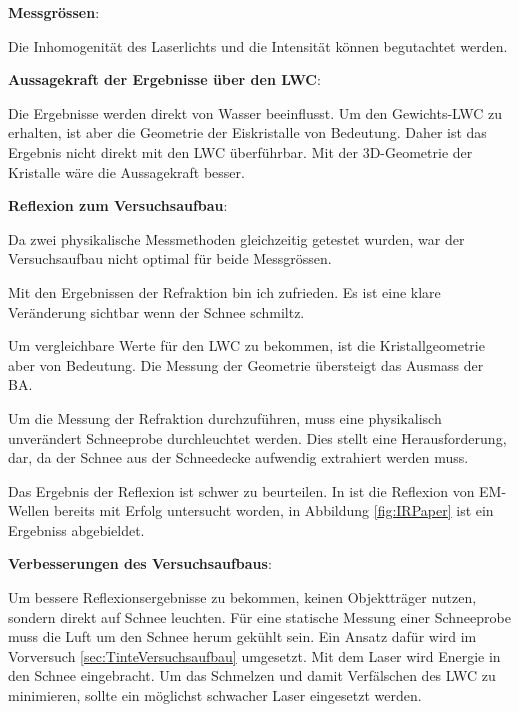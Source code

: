 \textbf{Messgrössen}:

Die Inhomogenität des Laserlichts und die Intensität können begutachtet werden. 



\textbf{Aussagekraft der Ergebnisse über den LWC}:

Die Ergebnisse werden direkt von Wasser beeinflusst. Um den Gewichts-LWC zu erhalten, ist aber die Geometrie der Eiskristalle von Bedeutung. Daher ist das Ergebnis nicht direkt mit den LWC überführbar. Mit der 3D-Geometrie der Kristalle wäre die Aussagekraft besser.

\textbf{Reflexion zum Versuchsaufbau}:

Da zwei physikalische Messmethoden gleichzeitig getestet wurden, war der Versuchsaufbau nicht optimal für beide Messgrössen.

Mit den Ergebnissen der Refraktion bin ich zufrieden. Es ist eine klare Veränderung sichtbar wenn der Schnee schmiltz.

Um vergleichbare Werte für den LWC zu bekommen, ist die Kristallgeometrie aber von Bedeutung. Die Messung der Geometrie übersteigt das Ausmass der BA.

Um die Messung der Refraktion durchzuführen, muss eine physikalisch unverändert Schneeprobe durchleuchtet werden. Dies stellt eine  Herausforderung, dar, da der Schnee  aus der Schneedecke aufwendig extrahiert werden muss.

Das Ergebnis der Reflexion ist schwer zu beurteilen. In \cite{Donahue.2022} ist die Reflexion von EM-Wellen bereits mit Erfolg untersucht worden, in Abbildung \ref{fig:IRPaper} ist ein Ergebniss abgebieldet.



\textbf{Verbesserungen des Versuchsaufbaus}:

Um bessere Reflexionsergebnisse zu bekommen, keinen Objektträger nutzen, sondern direkt auf Schnee leuchten. Für eine statische Messung einer Schneeprobe muss die Luft um den Schnee herum gekühlt sein. Ein Ansatz dafür wird im Vorversuch \ref{sec:TinteVersuchsaufbau} umgesetzt. Mit dem Laser wird Energie in den Schnee eingebracht. Um das Schmelzen und damit Verfälschen des LWC zu minimieren, sollte ein möglichst schwacher Laser eingesetzt werden.


